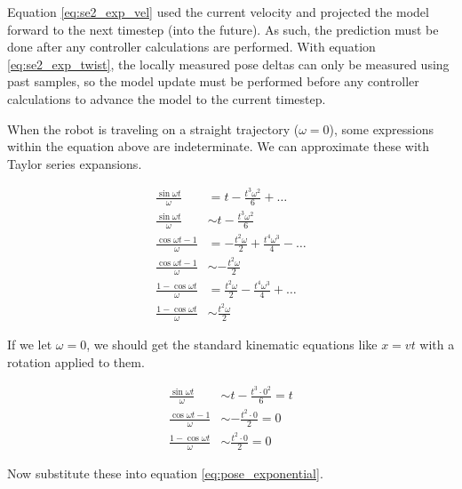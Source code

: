 Equation \eqref{eq:se2_exp_vel} used the current velocity and projected the
model forward to the next timestep (into the future). As such, the prediction
must be done after any controller calculations are performed. With equation
\eqref{eq:se2_exp_twist}, the locally measured pose deltas can only be measured
using past samples, so the model update must be performed before any controller
calculations to advance the model to the current timestep.

When the robot is traveling on a straight trajectory ($\omega = 0$), some
expressions within the equation above are indeterminate. We can approximate
these with Taylor series expansions.

\begin{align*}
  \frac{\sin\omega t}{\omega} &= t - \frac{t^3 \omega^2}{6} + \ldots \\
  \frac{\sin\omega t}{\omega} &\sim t - \frac{t^3 \omega^2}{6} \\
  \frac{\cos\omega t - 1}{\omega} &= -\frac{t^2 \omega}{2} + \frac{t^4 \omega^3}{4} - \ldots \\
  \frac{\cos\omega t - 1}{\omega} &\sim -\frac{t^2 \omega}{2} \\
  \frac{1 - \cos\omega t}{\omega} &= \frac{t^2 \omega}{2} - \frac{t^4 \omega^3}{4} + \ldots \\
  \frac{1 - \cos\omega t}{\omega} &\sim \frac{t^2 \omega}{2}
\end{align*}

If we let $\omega = 0$, we should get the standard kinematic equations like
$x = vt$ with a rotation applied to them.

\begin{align*}
  \frac{\sin\omega t}{\omega} &\sim t - \frac{t^3 \cdot 0^2}{6} = t \\
  \frac{\cos\omega t - 1}{\omega} &\sim -\frac{t^2 \cdot 0}{2} = 0 \\
  \frac{1 - \cos\omega t}{\omega} &\sim \frac{t^2 \cdot 0}{2} = 0
\end{align*}

Now substitute these into equation \eqref{eq:pose_exponential}.

